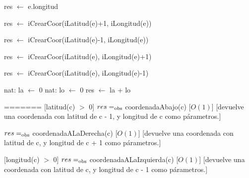 \begin{Interfaz}
\begin{algorithm}[H]
	\SetAlgoLined
	\NoCaptionOfAlgo
	\caption{}
	res $\leftarrow$ e.longitud\;
\end{algorithm}



\begin{algorithm}[H]
	\SetAlgoLined
	\NoCaptionOfAlgo
	\caption{}
	res $\leftarrow$ iCrearCoor(iLatitud(e)+1, iLongitud(e))\; 
\end{algorithm}

\begin{algorithm}[H]
	\SetAlgoLined
	\NoCaptionOfAlgo
	\caption{}
	res $\leftarrow$ iCrearCoor(iLatitud(e)-1, iLongitud(e))\; 
\end{algorithm}

\begin{algorithm}[H]
	\SetAlgoLined
	\NoCaptionOfAlgo
	\caption{}
	res $\leftarrow$ iCrearCoor(iLatitud(e), iLongitud(e)+1)\; 
\end{algorithm}

\begin{algorithm}[H]
	\SetAlgoLined
	\NoCaptionOfAlgo
	\caption{}
	res $\leftarrow$ iCrearCoor(iLatitud(e), iLongitud(e)-1)\; 
\end{algorithm}

\begin{algorithm}[H]
	\SetAlgoLined
	\NoCaptionOfAlgo
	\caption{}
	nat: la $\leftarrow$ 0\;
	nat: lo $\leftarrow$ 0\;
	res $\leftarrow$ la + lo\; 
\end{algorithm}
=======
	[latitud(c) $>$ 0]
	{$res =_{\mathrm{obs}}$ coordenadaAbajo(c)}
	[$O(1)$]
	[devuelve una coordenada con latitud de c - 1, y longitud de c como párametros.]

	{$res =_{\mathrm{obs}}$ coordenadaALaDerecha(c)}
	[$O(1)$]
	[devuelve una coordenada con latitud de c, y longitud de c + 1 como párametros.]

	[longitud(c) $>$ 0]
	{$res =_{\mathrm{obs}}$ coordenadaALaIzquierda(c)}
	[$O(1)$]
	[devuelve una coordenada con latitud de c, y longitud de c - 1 como párametros.]

\end{Interfaz}


